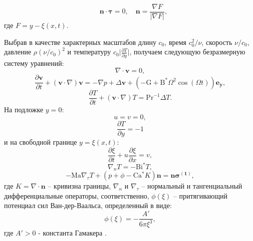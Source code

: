 \documentclass[12pt,a4paper]{article}
\begin{document}
\begin{equation*}
	\quad \mathbf{n} \cdot \boldsymbol{\tau} = 0, \quad 	\mathbf{n} = \frac{\nabla  F}{|{\nabla  F|} },
\end{equation*}
где $F = y - \xi(x, t)$.

Выбрав в качестве характерных масштабов длину $ c_0 $, время $ c_0^2/\nu $, скорость $\nu/ c_0$, давление $\rho (\nu/c_0)^2$ и  температуру $c_0  |{\frac {\partial T}{\partial y}|  }$, получаем следующую безразмерную систему уравнений:
\begin{equation} \label{eq:dmnsless_div_thermal}
	\nabla \cdot \mathbf{v} = 0,
\end{equation}
\begin{equation}
\frac{\partial \mathbf{v}}{\partial t} + (\mathbf{v} \cdot \nabla)\mathbf{v} = -\nabla p +\Delta \mathbf{v} + (- \mathrm{G} + \mathrm{B^*} \Omega^2 \cos(\Omega t) )\mathbf{e_y},
\end{equation}
\begin{equation}
	\frac{\partial T}{\partial t} + (\mathbf{v} \cdot \nabla)T = \mathrm{Pr}^{-1} \Delta T.
\end{equation}
На подложке $y=0$:
\begin{equation}
	u = v = 0,
\end{equation}
\begin{equation}
	\frac{\partial T}{\partial y} = -1
\end{equation}
и на свободной границе $y=\xi(x, t)$:
\begin{equation}\label{eq:surface_velocity_bc2_thermal}
	\frac{\partial \xi}{\partial t} + u \frac{\partial \xi}{\partial x} = v,
\end{equation}
\begin{equation}
	\nabla_nT=-\mathrm{Bi^*} T,
\end{equation}
\begin{equation}  \label{eq:dmnsless_bc_thermal}
	-\mathrm{Ma} \nabla_{\tau} T + (p + \phi - \mathrm{Ca^*} K) \mathbf{n} = \mathbf{n} \mathbf{\sigma^{(1)}},
\end{equation}
где $K=\nabla \cdot \mathbf{n}$ -- кривизна границы, $\nabla_{n}$ и $\nabla_{\tau}$ -- нормальный и тангенциальный дифференциальные операторы, соответственно, $\phi(\xi)$ -- притягивающий потенциал сил Ван-дер-Ваальса, определенный в виде:
\begin{equation*}
	\phi(\xi) = - \frac{A'}{6 \pi \xi^3},
\end{equation*}
где $A'>0$ - константа Гамакера \cite{Dzyaloshinskii1961}. 
\end{document}
